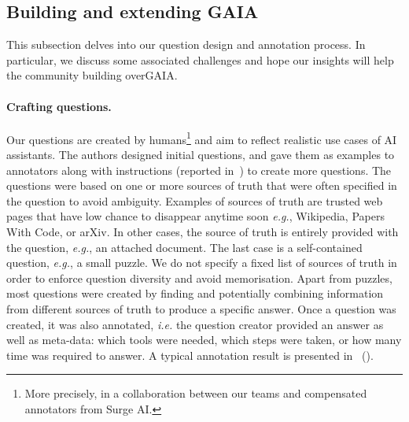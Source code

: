 \documentclass{fairmeta}
\newcommand{\benchmark}{\textsc{GAIA}}
\begin{document}
\subsection{Building and extending \benchmark{}}
\label{sec:guidelines}

This subsection delves into our question design and annotation process. In particular, we discuss some associated challenges and hope our insights will help the community building over\benchmark{}. 


\paragraph{Crafting questions.}

Our questions are created by humans\footnote{More precisely, in a collaboration between our teams and compensated annotators from Surge AI.} and aim to reflect realistic use cases of AI assistants. The authors designed initial questions, and gave them as examples to annotators along with instructions (reported in~) to create more questions. 
The questions were based on one or more sources of truth that were often specified in the question to avoid ambiguity. Examples of sources of truth are trusted web pages that have low chance to disappear anytime soon \textit{e.g.}, Wikipedia, Papers With Code, or arXiv. In other cases, the source of truth is entirely provided with the question, \textit{e.g.}, an attached document. The last case is a self-contained question, \textit{e.g.}, a small puzzle. We do not specify a fixed list of sources of truth in order to enforce question diversity and avoid memorisation. Apart from puzzles, most questions were created by finding and potentially combining information from different sources of truth to produce a specific answer. Once a question was created, it was also annotated, \textit{i.e.} the question creator provided an answer as well as meta-data: which tools were needed, which steps were taken, or how many time was required to answer. A typical annotation result is presented in~ (). 
\end{document}
